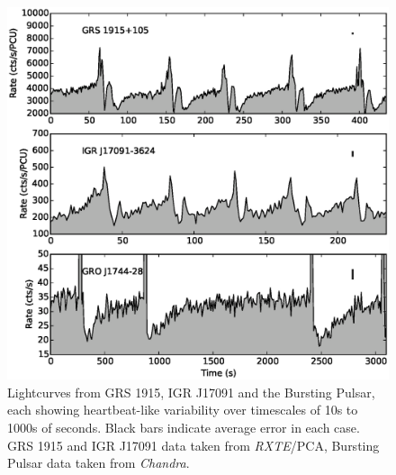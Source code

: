 \begin{figure}
  \centering
  \includegraphics[width=.9\linewidth, trim= 0mm 0mm 0mm 0mm,clip]{images/BPco1.eps}
  \caption[Lightcurves from GRS 1915, IGR J17091 and the Bursting Pulsar, showing lightcurves with Normal Burst-like behaviour for each.]{Lightcurves from GRS 1915, IGR J17091 and the Bursting Pulsar, each showing heartbeat\indexrho-like variability over timescales of 10s to 1000s of seconds.  Black bars indicate average error in each case.  GRS 1915 and IGR J17091 data taken from \indexpca\textit{RXTE}/PCA, Bursting Pulsar data taken from \indexchandra\textit{Chandra}.}
  \label{fig:BP_with_IGR1}
\end{figure}

